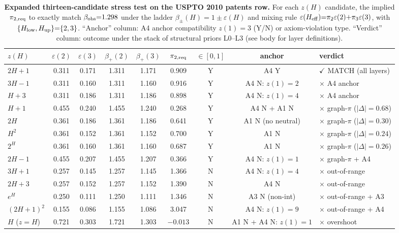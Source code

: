 \begin{table}[h]
\centering
\scriptsize
\caption{\textbf{Expanded thirteen-candidate stress test on the USPTO 2010 patents row.} For each \(z(H)\) candidate, the implied \(\pi_{2,\rm req}\) to exactly match \(\beta_{\rm obs}{=}1.298\) under the ladder \(\beta_{\pm}(H){=}1\pm\varepsilon(H)\) and mixing rule \(\varepsilon(H_{\rm eff}){=}\pi_2\varepsilon(2){+}\pi_3\varepsilon(3)\), with \(\{H_{\rm low},H_{\rm up}\}{=}\{2,3\}\). ``Anchor'' column: A4 anchor compatibility \(z(1){=}3\) (Y/N) or axiom-violation type. ``Verdict'' column: outcome under the stack of structural priors L0--L3 (see body for layer definitions).}
\label{tab:candidate_stress_test}
\renewcommand{\arraystretch}{1.05}
\begin{tabular}{l c c c c c c c l}
\toprule
\(z(H)\) & \(\varepsilon(2)\) & \(\varepsilon(3)\) & \(\beta_+(2)\) & \(\beta_+(3)\) & \(\pi_{2,\rm req}\) & \(\in[0,1]\) & anchor & verdict \\
\midrule
\(2H{+}1\) & 0.311 & 0.171 & 1.311 & 1.171 & 0.909 & Y & A4 Y & \(\checkmark\) MATCH (all layers) \\
\(3H{-}1\) & 0.311 & 0.160 & 1.311 & 1.160 & 0.916 & Y & A4 N: \(z(1){=}2\) & \(\times\) A4 anchor \\
\(H{+}3\)  & 0.311 & 0.186 & 1.311 & 1.186 & 0.898 & Y & A4 N: \(z(1){=}4\) & \(\times\) A4 anchor \\
\(H{+}1\)  & 0.455 & 0.240 & 1.455 & 1.240 & 0.268 & Y & A4 N + A1 N & \(\times\) graph-\(\pi\) (\(|\Delta|{=}0.68\)) \\
\(2H\)     & 0.361 & 0.186 & 1.361 & 1.186 & 0.641 & Y & A1 N (no neutral) & \(\times\) graph-\(\pi\) (\(|\Delta|{=}0.30\)) \\
\(H^2\)    & 0.361 & 0.152 & 1.361 & 1.152 & 0.700 & Y & A1 N & \(\times\) graph-\(\pi\) (\(|\Delta|{=}0.24\)) \\
\(2^H\)    & 0.361 & 0.160 & 1.361 & 1.160 & 0.687 & Y & A1 N & \(\times\) graph-\(\pi\) (\(|\Delta|{=}0.26\)) \\
\(2H{-}1\) & 0.455 & 0.207 & 1.455 & 1.207 & 0.366 & Y & A4 N: \(z(1){=}1\) & \(\times\) graph-\(\pi\) + A4 \\
\(3H{+}1\) & 0.257 & 0.145 & 1.257 & 1.145 & 1.366 & N & A4 N: \(z(1){=}4\) & \(\times\) out-of-range \\
\(2H{+}3\) & 0.257 & 0.152 & 1.257 & 1.152 & 1.390 & N & A4 N & \(\times\) out-of-range \\
\(e^H\)    & 0.250 & 0.111 & 1.250 & 1.111 & 1.346 & N & A3 N (non-int) & \(\times\) out-of-range + A3 \\
\((2H{+}1)^2\) & 0.155 & 0.086 & 1.155 & 1.086 & 3.047 & N & A4 N: \(z(1){=}9\) & \(\times\) out-of-range + A4 \\
\(H\) (\(z{=}H\)) & 0.721 & 0.303 & 1.721 & 1.303 & \(-0.013\) & N & A1 N + A4 N: \(z(1){=}1\) & \(\times\) overshoot \\
\bottomrule
\end{tabular}
\end{table}

